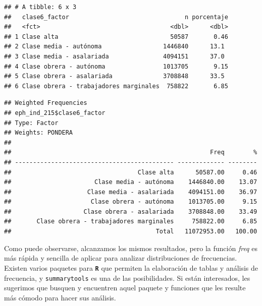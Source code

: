 \documentclass[
]{book}
\newenvironment{Shaded}{\begin{snugshade}}{\end{snugshade}}
\newcommand{\AttributeTok}[1]{\textcolor[rgb]{0.77,0.63,0.00}{#1}}
\newcommand{\ConstantTok}[1]{\textcolor[rgb]{0.00,0.00,0.00}{#1}}
\newcommand{\FunctionTok}[1]{\textcolor[rgb]{0.00,0.00,0.00}{#1}}
\newcommand{\NormalTok}[1]{#1}
\newcommand{\SpecialCharTok}[1]{\textcolor[rgb]{0.00,0.00,0.00}{#1}}
\begin{document}
\begin{verbatim}
## # A tibble: 6 x 3
##   clase6_factor                                n porcentaje
##   <fct>                                    <dbl>      <dbl>
## 1 Clase alta                               50587       0.46
## 2 Clase media - autónoma                 1446840      13.1 
## 3 Clase media - asalariada               4094151      37.0 
## 4 Clase obrera - autónoma                1013705       9.15
## 5 Clase obrera - asalariada              3708848      33.5 
## 6 Clase obrera - trabajadores marginales  758822       6.85
\end{verbatim}

\begin{Shaded}
\end{Shaded}

\begin{verbatim}
## Weighted Frequencies  
## eph_ind_215$clase6_factor  
## Type: Factor  
## Weights: PONDERA  
## 
##                                                       Freq        %
## -------------------------------------------- ------------- --------
##                                   Clase alta      50587.00     0.46
##                       Clase media - autónoma    1446840.00    13.07
##                     Clase media - asalariada    4094151.00    36.97
##                      Clase obrera - autónoma    1013705.00     9.15
##                    Clase obrera - asalariada    3708848.00    33.49
##       Clase obrera - trabajadores marginales     758822.00     6.85
##                                        Total   11072953.00   100.00
\end{verbatim}

Como puede observarse, alcanzamos los mismos resultados, pero la función \emph{freq} es más rápida y sencilla de aplicar para analizar distribuciones de frecuencias. Existen varios paquetes para \textbf{\texttt{R}} que permiten la elaboración de tablas y análisis de frecuencia, y \texttt{summarytools} es una de las posibilidades. Si están interesados, les sugerimos que busquen y encuentren aquel paquete y funciones que les resulte más cómodo para hacer sus análisis.
\end{document}
